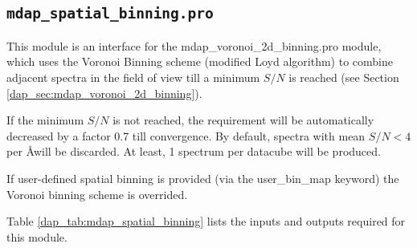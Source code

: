 \subsection{{\tt mdap\_spatial\_binning.pro}}
\label{dap_sec:mdap_spatial_binning}

This module is an interface for the mdap\_voronoi\_2d\_binning.pro
module, which uses the Voronoi Binning scheme (modified Loyd
algorithm) to combine adjacent spectra in the field of view till a
minimum $S/N$ is reached (see Section
\ref{dap_sec:mdap_voronoi_2d_binning}).

If the minimum $S/N$ is not reached, the requirement will be
automatically decreased by a factor 0.7 till convergence. By default,
spectra with mean $S/N < 4$ per \AA will be discarded. At least, 1
spectrum per datacube will be produced.

If user-defined spatial binning is provided (via the user\_bin\_map
keyword) the Voronoi binning scheme is overrided.

Table \ref{dap_tab:mdap_spatial_binning} lists the inputs and outputs
required for this module.

